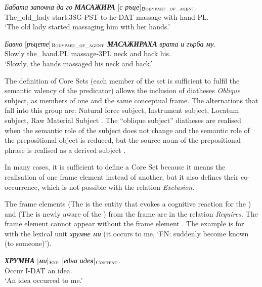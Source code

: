 \documentclass[output=paper,colorlinks,citecolor=brown]{langscibook}
\begin{document}
 \begin{exe}
 \ex  \label{ch01:ex:40}
  \gll  \textit{Бабата} \textit{започна}   \textit{да}  \textit{го}  \textbf{\textit{МАСАЖИРА}} [\textit{с ръце}]$_{\text{\textsc{Bodypart\_of\_agent}}}$. \\
 The\_old\_lady  start.3SG-PST to  he-DAT   massage {with hand-PL.}\\
 \glt `The old lady started massaging him with her hands.'
 \end{exe} 
 
\begin{exe}
 \ex  \label{ch01:ex:41}
 \gll \textit{Бавно}  [\textit{ръцете}]$_{\text{\textsc{Bodypart\_of\_agent}}}$  \textit{\textbf{МАСАЖИРАХА}}  \textit{врата}  \textit{и}  \textit{гърба}  \textit{му}. \\
 Slowly the\_hand.PL massage-3PL neck  and  back his. \\
 \glt `Slowly, the hands massaged his neck and back.'
 \end{exe} 
  

The definition of Core Sets (each member of the set is sufficient to fulfil the semantic valency of the predicator) allows the inclusion of diatheses \textit{Oblique} subject, as members of one and the same conceptual frame. The alternations that fall into this group are: Natural force subject, Instrument subject, Locatum subject, Raw Material Subject \citep[79–83]{Levin:93}. The ``oblique subject'' diatheses are realised when the semantic role of the subject does not change and the semantic role of the prepositional object is reduced, but the source noun of the prepositional phrase is realised as a derived subject \citep[148]{Koeva2022}.

In many cases, it is sufficient to define a Core Set because it means the realisation of one frame element instead of another, but it also defines their co-occurrence, which is not possible with the relation \textit{Exclusion}.
 
The frame elements  (The  is the entity that evokes a cognitive reaction for the ) and  (The  is newly aware of the ) from the frame  are in the relation \textit{Requires}. The frame element  cannot appear without the frame element . The example is for with the lexical unit \textit{хрумне ми} (it occurs to me, `FN: suddenly become known (to someone)’).


\begin{exe}
 \ex  \label{ch01:ex:42}
 \gll \textit{\textbf{ХРУМНА}}   [\textit{ми}]$_{\text{\textsc{Exp}}}$  [\textit{една}  \textit{идея}]$_{\text{\textsc{Content}}}$. \\
 Occur  I-DAT an  idea. \\
 \glt `An idea occurred to me.'
 \end{exe} 
 
\end{document}
